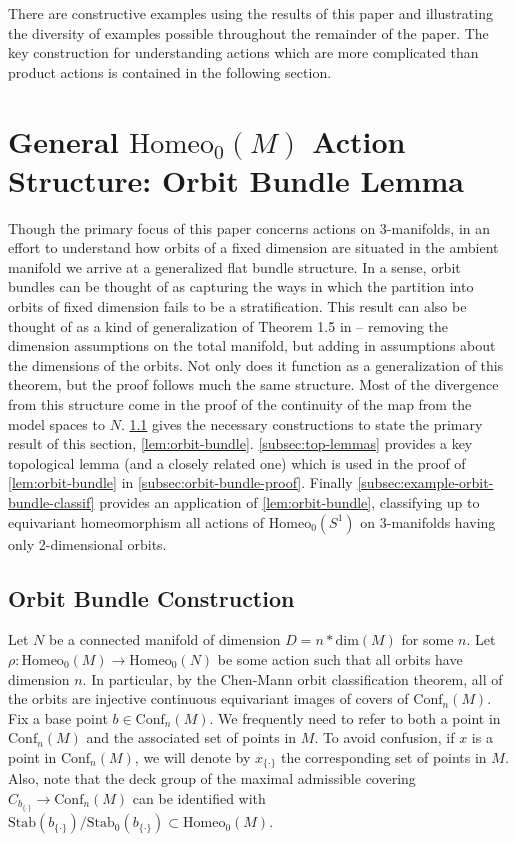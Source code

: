 \documentclass[10pt, oneside]{article}
\newcommand{\homeo}[1][S^1]{\text{Homeo}_0(#1)}
\newcommand{\conf}[2][S^1]{\text{Conf}_{#2}(#1)}
\newcommand{\set}{{\{\cdot\}}}
\newcommand{\stab}[1]{\text{Stab}(#1)}
\newcommand{\pstab}[1]{\text{Stab}_0(#1)}
\newcommand{\maxcov}{C_{b_\set}}
\theoremstyle{definition}
\theoremstyle{definition}
\begin{document}
There are constructive examples using the results of this paper and illustrating the diversity of examples possible throughout the remainder of the paper. The key construction for understanding actions which are more complicated than product actions is contained in the following section.


\section{General \texorpdfstring{$\homeo[M]$}{Homeo\_0(M)} Action Structure: Orbit Bundle Lemma}\label{sec:orbit-bundle-lemma}
Though the primary focus of this paper concerns actions on 3-manifolds, in an effort to understand how orbits of a fixed dimension are situated in the ambient manifold we arrive at a generalized flat bundle structure. In a sense, orbit bundles can be thought of as capturing the ways in which the partition into orbits of fixed dimension fails to be a stratification. This result can also be thought of as a kind of generalization of Theorem 1.5 in \cite{chen_structure_2023} -- removing the dimension assumptions on the total manifold, but adding in assumptions about the dimensions of the orbits. Not only does it function as a generalization of this theorem, but the proof follows much the same structure. Most of the divergence from this structure come in the proof of the continuity of the map from the model spaces to $N$. \cref{subsec:orbit-bundle-construction} gives the necessary constructions to state the primary result of this section, \cref{lem:orbit-bundle}. \cref{subsec:top-lemmas} provides a key topological lemma (and a closely related one) which is used in the proof of \cref{lem:orbit-bundle} in \cref{subsec:orbit-bundle-proof}. Finally \cref{subsec:example-orbit-bundle-classif} provides an application of \cref{lem:orbit-bundle}, classifying up to equivariant homeomorphism all actions of $\homeo$ on 3-manifolds having only 2-dimensional orbits.

\subsection{Orbit Bundle Construction}\label{subsec:orbit-bundle-construction}
Let $N$ be a connected manifold of dimension $D=n*\text{dim}(M)$ for some $n$. Let $\rho:\homeo[M]\to\homeo[N]$ be some action such that all orbits have dimension $n$. In particular, by the Chen-Mann orbit classification theorem, all of the orbits are injective continuous equivariant images of covers of $\conf[M]{n}$.
Fix a base point $b\in \conf[M]{n}$. 
We frequently need to refer to both a point in $\conf[M]{n}$
and the associated set of points in $M$.
To avoid confusion,
if $x$ is a point in $\conf[M]{n}$,
we will denote by $x_\set$ the corresponding set of points in $M$.
Also, 
note that the deck group of the maximal admissible covering $\maxcov \to \conf[M]{n}$ can be identified with $\stab{b_\set}/\pstab{b_\set}\subset\homeo[M]$.
\end{document}
